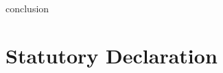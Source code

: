 \documentclass[11pt, a4paper]{article} %
\makeatletter
\theoremstyle{definition}
\newcommand{\signature}[2][5cm]{%
  \begin{tabular}{@{}p{#1}@{}}
    #2 \\[2\normalbaselineskip] \hrule \\[0pt]
    {\small \textit{Signature}} \\[2\normalbaselineskip] \hrule \\[0pt]
    {\small \textit{Place, Date}}
  \end{tabular}
}
\makeatother
\begin{document}

{conclusion}

\newpage %

%
\medskip



\newpage %
\thispagestyle{empty} %
\section*{Statutory Declaration} %

\vspace*{1in} %




\end{document}
